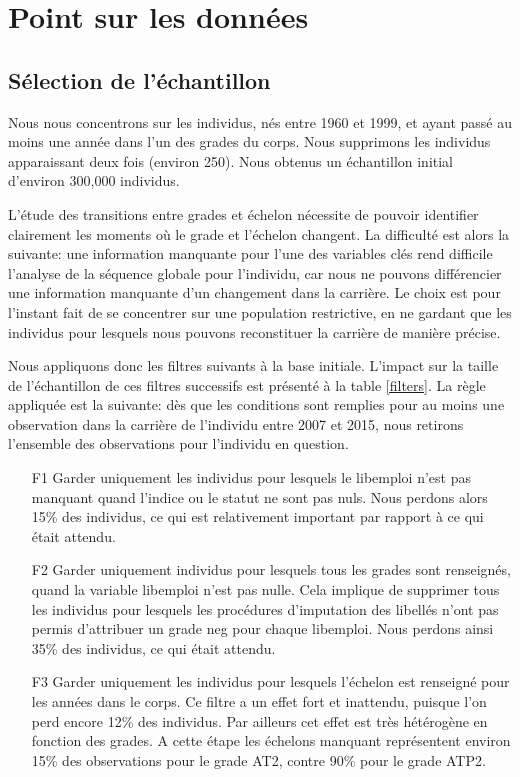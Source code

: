 \documentclass[11pt,a4paper]{article}
\begin{document}
\section{Point sur les données} \label{data}


\subsection{Sélection de l'échantillon}

Nous nous concentrons sur les individus, nés entre 1960 et 1999, et ayant passé au moins une année dans l'un des grades du corps. Nous supprimons les individus apparaissant deux fois (environ 250). Nous obtenus un échantillon initial d'environ 300,000 individus. 

L'étude des transitions entre grades et échelon nécessite de pouvoir identifier clairement les moments où le grade et l'échelon changent. La difficulté est alors la suivante: une information manquante pour l'une des variables clés rend difficile l'analyse de la séquence globale pour l'individu, car nous ne pouvons différencier une information manquante d'un changement dans la carrière. Le choix est pour l'instant fait de se concentrer sur une population restrictive, en ne gardant que les individus pour lesquels nous pouvons reconstituer la carrière de manière précise. 

Nous appliquons donc les filtres suivants à la base initiale. L'impact sur la taille de l'échantillon de ces filtres successifs est présenté à la table \ref{filters}. La règle appliquée est la suivante: dès que les conditions sont remplies pour au moins une observation dans la carrière de l'individu entre 2007 et 2015, nous retirons l'ensemble des observations pour l'individu en question. 
\begin{enumerate}[leftmargin=1cm ,parsep=0cm,itemsep=0cm,topsep=0cm] 
\item[F1] Garder uniquement les individus pour lesquels le libemploi n'est pas manquant quand l'indice ou le statut ne sont pas nuls. Nous perdons alors 15\% des individus, ce qui est relativement important par rapport à ce qui était attendu. 
\item[F2] Garder uniquement individus pour lesquels tous les grades sont renseignés, quand la variable libemploi n'est pas nulle. Cela implique de supprimer tous les individus pour lesquels les procédures d'imputation des libellés n'ont pas permis d'attribuer un grade neg pour chaque libemploi. Nous perdons ainsi 35\% des individus, ce qui était attendu. 
\item[F3] Garder uniquement les individus pour lesquels l'échelon est renseigné pour les années dans le corps. Ce filtre a un effet fort et inattendu, puisque l'on perd encore 12\% des individus. Par ailleurs cet effet est très hétérogène en fonction des grades. A cette étape les échelons manquant représentent environ 15\% des observations pour le grade AT2, contre 90\% pour le grade ATP2.
\end{enumerate}
\end{document}
